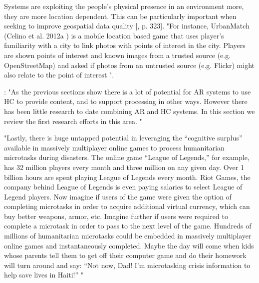 Systems are exploiting the people's physical presence in an environment more, they are more location dependent. This can be particularly important when seeking to improve geospatial data quality [\citep{Meier2013}, p. 323]. "For instance, UrbanMatch (Celino et al. 2012a ) is a mobile location based game that uses player’s familiarity with a city to link photos with points of interest in the city. Players are shown points of interest and known images from a trusted source (e.g. OpenStreetMap) and asked if photos from an untrusted source (e.g. Flickr) might also relate to the point of interest ".  

\citep{Meier2013}:  "As the previous sections show there is a lot of potential for AR systems to use HC to provide content, and to support processing in other ways. However there has been
little research to date combining AR and HC systems. In this section we review the first research efforts in this area. " 

\citep{Meier2013} "Lastly, there is huge untapped potential in leveraging the “cognitive surplus” available in massively multiplayer online games to process humanitarian microtasks during disasters. The online game “League of Legends,” for example, has 32 million players every month and three million on any given day. Over 1 billion hours are spent playing League of Legends every month. Riot Games, the company behind League of Legends is even paying salaries to select League of Legend players. Now imagine if users of the game were given the option of completing microtasks in order to acquire additional virtual currency, which can buy better weapons, armor, etc. Imagine further if users were required to complete a microtask in order to pass to the next level of the game. Hundreds of millions of humanitarian microtasks could be embedded in massively multiplayer online games and instantaneously completed. Maybe the day will come when kids whose parents tell them to get off their computer game and do their homework will turn around and say: “Not now, Dad! I’m microtasking crisis information to help save lives in Haiti!” "